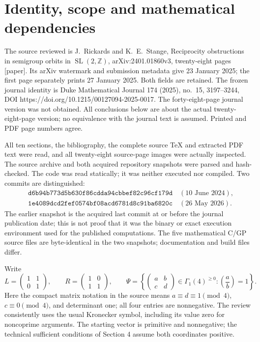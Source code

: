 \documentclass[10pt]{article}
\begin{document}
\section*{Identity, scope and mathematical dependencies}
The source reviewed is J. Rickards and K. E. Stange, Reciprocity obstructions in semigroup orbits in \(\operatorname{SL}(2,\mathbb Z)\), arXiv:2401.01860v3, twenty-eight pages [paper]. Its arXiv watermark and submission metadata give 23 January 2025; the first page separately prints 27 January 2025. Both fields are retained. The frozen journal identity is Duke Mathematical Journal 174 (2025), no. 15, 3197–3244, DOI https://doi.org/10.1215/00127094-2025-0017. The forty-eight-page journal version was not obtained. All conclusions below are about the actual twenty-eight-page version; no equivalence with the journal text is assumed. Printed and PDF page numbers agree.\par
All ten sections, the bibliography, the complete source TeX and extracted PDF text were read, and all twenty-eight source-page images were actually inspected. The source archive and both acquired repository snapshots were parsed and hash-checked. The code was read statically; it was neither executed nor compiled. Two commits are distinguished: \[\begin{split}
&\texttt{d6b94b773d5b630f86cdda94cbbef82c96cf179d}
   \quad(10\text{ June }2024),\\
&\texttt{1e4089dcd2fef0574bf08acd6781d8c91ba6820c}
   \quad(26\text{ May }2026).
\end{split}\] The earlier snapshot is the acquired last commit at or before the journal publication date; this is not proof that it was the binary or exact execution environment used for the published computations. The five mathematical C/GP source files are byte-identical in the two snapshots; documentation and build files differ.\par
Write \[L=\begin{pmatrix}1&1\\0&1\end{pmatrix},\qquad R=\begin{pmatrix}1&0\\1&1\end{pmatrix},\qquad
 \Psi=\left\{\begin{pmatrix}a&b\\c&d\end{pmatrix}\in\Gamma_1(4)^{\geq0}:
                  \left(\frac{a}{b}\right)=1\right\}.\] Here the compact matrix notation in the source means \(a\equiv d\equiv1\pmod4\), \(c\equiv0\pmod4\), and determinant one; all four entries are nonnegative. The review consistently uses the usual Kronecker symbol, including its value zero for noncoprime arguments. The starting vector is primitive and nonnegative; the technical sufficient conditions of Section 4 assume both coordinates positive.\par
\end{document}
